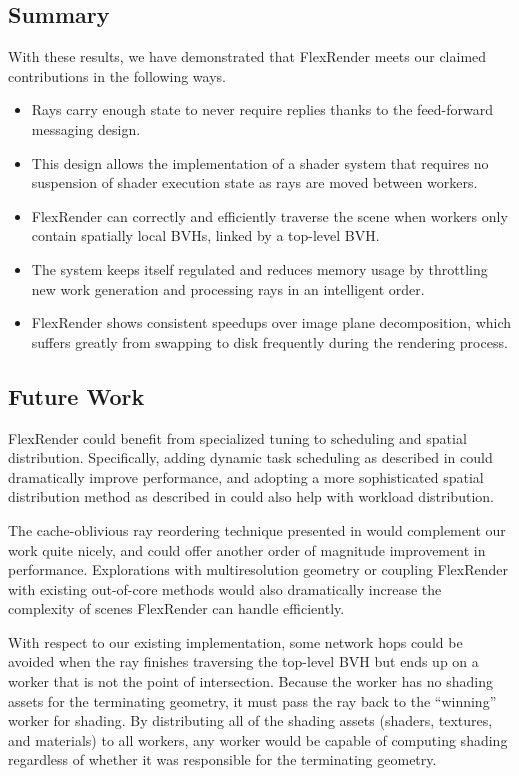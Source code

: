 \documentclass[a4paper,twoside]{article}
\begin{document}
\subsection{Summary}
\label{resultssummary}

With these results, we have demonstrated that FlexRender meets our claimed
contributions in the following ways.

\begin{itemize}
    \item Rays carry enough state to never require replies thanks to the
        feed-forward messaging design.
    \item This design allows the implementation of a shader system that requires
        no suspension of shader execution state as rays are moved between
        workers.
    \item FlexRender can correctly and efficiently traverse the scene when workers
        only contain spatially local BVHs, linked by a top-level BVH.
    \item The system keeps itself regulated and reduces memory usage by
        throttling new work generation and processing rays in an intelligent
        order.
    \item FlexRender shows consistent speedups over image plane decomposition,
        which suffers greatly from swapping to disk frequently during the
        rendering process.
\end{itemize}

\subsection{Future Work}
\label{futurework}

FlexRender could benefit from specialized tuning to scheduling and
spatial distribution.  Specifically, adding dynamic task scheduling as described in
\cite{navratil:2012} could dramatically improve performance, and adopting a
more sophisticated spatial distribution method as described in
\cite{badouel:1994} could also help with workload distribution.

The cache-oblivious ray reordering technique presented in \cite{moon:2010}
would complement our work quite nicely, and could offer another order of
magnitude improvement in performance. Explorations with multiresolution geometry
or coupling FlexRender with existing out-of-core methods would also dramatically
increase the complexity of scenes FlexRender can handle efficiently.

With respect to our existing implementation, some network hops could be
avoided when the ray finishes traversing the top-level BVH but ends up on a
worker that is not the point of intersection.  Because the worker has no
shading assets for the terminating geometry, it must pass the ray back to the
``winning'' worker for shading. By distributing all of the shading assets
(shaders, textures, and materials) to all workers, any worker would be capable
of computing shading regardless of whether it was responsible for the
terminating geometry.
\end{document}
